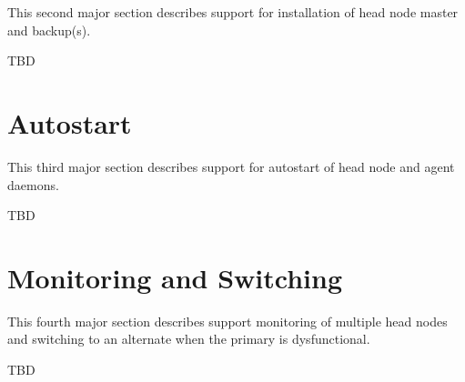 \documentclass[letterpaper]{article}
\begin{document}
This second major section describes support for installation of head node master and backup(s).

TBD

\section{Autostart}

This third major section describes support for autostart of head node and agent daemons.

TBD

\section{Monitoring and Switching}

This fourth major section describes support monitoring of multiple head nodes and switching to an alternate when the primary is dysfunctional.

TBD
\end{document}
